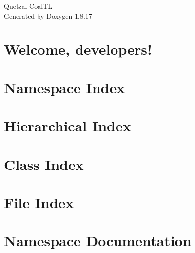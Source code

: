 \let\mypdfximage\pdfximage\def\pdfximage{\immediate\mypdfximage}\documentclass[twoside]{book}
\newcommand{\+}{\discretionary{\mbox{\scriptsize$\hookleftarrow$}}{}{}}
\newcommand{\clearemptydoublepage}{%
  \newpage{\pagestyle{empty}\cleardoublepage}%
}
\begin{document}
\hypersetup{pageanchor=false,
             bookmarksnumbered=true,
             pdfencoding=unicode
            }
\begin{titlepage}
\vspace*{7cm}
\begin{center}%
{\Large Quetzal-\/\+Coal\+TL }\\
\vspace*{1cm}
{\large Generated by Doxygen 1.8.17}\\
\end{center}
\end{titlepage}
\clearemptydoublepage
{}
\tableofcontents
\clearemptydoublepage
{}
\hypersetup{pageanchor=true}

\chapter{Welcome, developers!}
\label{index}\hypertarget{index}{}
\chapter{Namespace Index}

\chapter{Hierarchical Index}

\chapter{Class Index}

\chapter{File Index}

\chapter{Namespace Documentation}




















\end{document}
